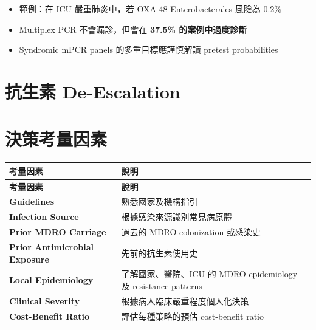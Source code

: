 \documentclass[12pt,a4paper]{article}
\begin{document}
\begin{itemize}
    \item 範例：在 ICU 嚴重肺炎中，若 OXA-48 Enterobacterales 風險為 0.2\%
    \item Multiplex PCR 不會漏診，但會在 \textbf{37.5\% 的案例中過度診斷}
    \item Syndromic mPCR panels 的多重目標應謹慎解讀 pretest probabilities
\end{itemize}

\section{抗生素 De-Escalation}


\section{決策考量因素}

\begin{longtable}{p{5cm}p{9cm}}
\toprule
\textbf{考量因素} & \textbf{說明} \\
\midrule
\endfirsthead

\toprule
\textbf{考量因素} & \textbf{說明} \\
\midrule
\endhead

\bottomrule
\endfoot

\textbf{Guidelines} & 熟悉國家及機構指引 \\
\midrule
\textbf{Infection Source} & 根據感染來源識別常見病原體 \\
\midrule
\textbf{Prior MDRO Carriage} & 過去的 MDRO colonization 或感染史 \\
\midrule
\textbf{Prior Antimicrobial Exposure} & 先前的抗生素使用史 \\
\midrule
\textbf{Local Epidemiology} & 了解國家、醫院、ICU 的 MDRO epidemiology 及 resistance patterns \\
\midrule
\textbf{Clinical Severity} & 根據病人臨床嚴重程度個人化決策 \\
\midrule
\textbf{Cost-Benefit Ratio} & 評估每種策略的預估 cost-benefit ratio \\
\bottomrule
\end{longtable}
\end{document}
